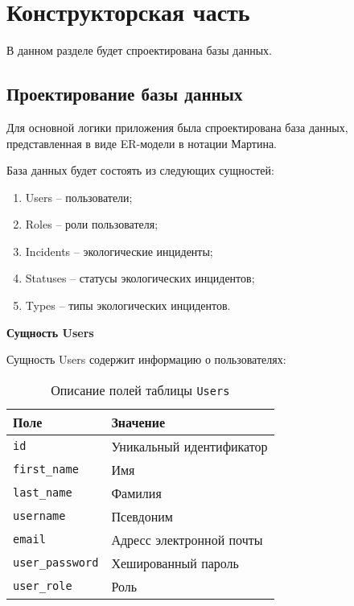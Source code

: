 \chapter{Конструкторская часть}
В данном разделе будет спроектирована базы данных.

\section{Проектирование базы данных}
Для основной логики приложения была спроектирована база данных, представленная в виде ER-модели в нотации Мартина.  


База данных будет состоять из следующих сущностей:
\begin{enumerate}
\item Users -- пользователи;
\item Roles -- роли пользователя;
\item Incidents -- экологические инциденты;
\item Statuses -- статусы экологических инцидентов;
\item Types -- типы экологических инцидентов.
\end{enumerate}

\newpage
\noindent\textbf{Сущность Users}

Сущность Users содержит информацию о пользователях:
\begin{table}[!ht]
    \caption{Описание полей таблицы \texttt{Users}}
    \label{tbl:users}
    \begin{center}
        \begin{tabular}{|p{}p{}|}
            \hline
            \textbf{Поле} & \textbf{Значение} \\\hline
            \texttt{id} & Уникальный идентификатор \\\hline
            \texttt{first\_name} & Имя\\\hline
            \texttt{last\_name} & Фамилия \\\hline
            \texttt{username} & Псевдоним \\\hline
            \texttt{email} & Адресс электронной почты \\\hline
            \texttt{user\_password} & Хешированный пароль \\\hline
            \texttt{user\_role} & Роль \\\hline
        \end{tabular}
    \end{center}
\end{table}

